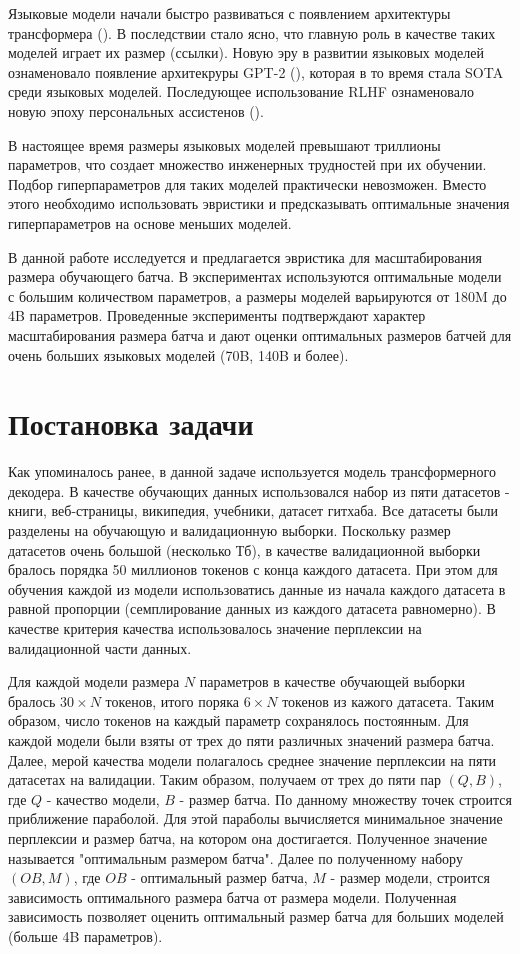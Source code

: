 \documentclass{article}
\begin{document}
\quad Языковые модели начали быстро развиваться с появлением архитектуры трансформера (\cite{vaswani2017attention}). В последствии стало ясно, что главную роль в качестве таких моделей играет их размер (ссылки). Новую эру в развитии языковых  моделей ознаменовало появление архитекруры GPT-2 (\cite{radford2019language}), которая в то время стала SOTA среди языковых моделей. Последующее использование RLHF ознаменовало новую эпоху персональных ассистенов (\cite{ouyang2022training}).


\quad В настоящее время размеры языковых моделей превышают триллионы параметров, что создает множество инженерных трудностей при их обучении. Подбор гиперпараметров для таких моделей практически невозможен. Вместо этого необходимо использовать эвристики и предсказывать оптимальные значения гиперпараметров на основе меньших моделей.

\quad В данной работе исследуется и предлагается эвристика для масштабирования размера обучающего батча. В экспериментах используются оптимальные модели с большим количеством параметров, а размеры моделей варьируются от 180M до 4B параметров. Проведенные эксперименты подтверждают характер масштабирования размера батча и дают оценки оптимальных размеров батчей для очень больших языковых моделей (70B, 140B и более).


\section{Постановка задачи}
\label{sec:headings}
Как упоминалось ранее, в данной задаче используется модель трансформерного декодера. В качестве обучающих данных  использовался набор из пяти датасетов - книги, веб-страницы, википедия, учебники, датасет гитхаба. Все датасеты были разделены на обучающую и валидационную выборки. Поскольку размер датасетов очень большой (несколько Тб), в качестве валидационной выборки бралось порядка 50 миллионов токенов с конца каждого датасета. При этом для обучения каждой из модели использоватись данные из начала каждого датасета в равной пропорции (семплирование данных из каждого датасета равномерно). В качестве критерия качества использовалось значение перплексии на валидационной части данных.

Для каждой модели размера $N$ параметров в качестве обучающей выборки бралось $30 \times N$ токенов, итого поряка $6 \times N$ токенов из кажого датасета. Таким образом, число токенов на каждый параметр сохранялось постоянным. Для каждой модели были взяты от трех до пяти различных значений размера батча. Далее, мерой качества модели полагалось среднее значение перплексии на пяти датасетах на валидации. Таким образом, получаем от трех до пяти пар $(Q, B)$, где $Q$ - качество модели, $B$ - размер батча. По данному множеству точек строится приближение параболой. Для этой параболы вычисляется минимальное значение перплексии и размер батча, на котором она достигается. Полученное значение называется "оптимальным размером батча". Далее по полученному набору $(OB, M)$, где $OB$ - оптимальный размер батча, $M$ - размер модели, строится зависимость оптимального размера батча от размера модели. Полученная зависимость позволяет оценить оптимальный размер батча для больших моделей (больше 4B параметров).
\end{document}
